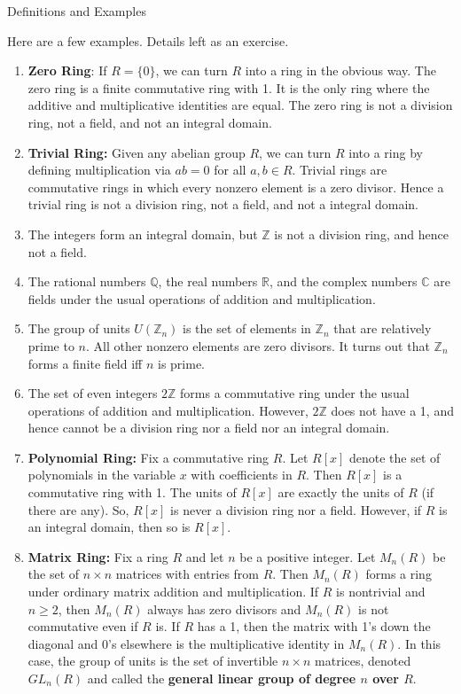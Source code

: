 \begin{section}{Definitions and Examples}
\begin{example}
Here are a few examples.  Details left as an exercise.
\begin{enumerate}[label=\rm{(\alph*)}]
\item \textbf{Zero Ring}: If $R=\{0\}$, we can turn $R$ into a ring in the obvious way.  The zero ring is a finite commutative ring with 1.  It is the only ring where the additive and multiplicative identities are equal.  The zero ring is not a division ring, not a field, and not an integral domain.
\item \textbf{Trivial Ring:} Given any abelian group $R$, we can turn $R$ into a ring by defining multiplication via $ab=0$ for all $a,b\in R$. Trivial rings are commutative rings in which every nonzero element is a zero divisor.  Hence a trivial ring is not a division ring, not a field, and not a integral domain.
\item 
The integers form an integral domain, but $\mathbb{Z}$ is not a division ring, and hence not a field.
\item The rational numbers $\mathbb{Q}$, the real numbers $\mathbb{R}$, and the complex numbers $\mathbb{C}$ are fields under the usual operations of addition and multiplication.
\item 
The group of units $U(\mathbb{Z}_n)$ is the set of elements in $\mathbb{Z}_n$ that are relatively prime to $n$.  All other nonzero elements are zero divisors.  It turns out that $\mathbb{Z}_n$ forms a finite field iff $n$ is prime.
\item The set of even integers $2\mathbb{Z}$ forms a commutative ring under the usual operations of addition and multiplication.  However, $2\mathbb{Z}$ does not have a 1, and hence cannot be a division ring nor a field nor an integral domain.
\item \textbf{Polynomial Ring:} Fix a commutative ring $R$.  Let $R[x]$ denote the set of polynomials in the variable $x$ with coefficients in $R$.  Then $R[x]$ is a commutative ring with 1. The units of $R[x]$ are exactly the units of $R$ (if there are any). So, $R[x]$ is never a division ring nor a field.  However, if $R$ is an integral domain, then so is $R[x]$. 
\item \textbf{Matrix Ring:} Fix a ring $R$ and let $n$ be a positive integer.  Let $M_n(R)$ be the set of $n\times n$ matrices with entries from $R$.  Then $M_n(R)$ forms a ring under ordinary matrix addition and multiplication.  If $R$ is nontrivial and $n\geq 2$, then $M_n(R)$ always has zero divisors and $M_n(R)$ is not commutative even if $R$ is.  If $R$ has a 1, then the matrix with 1's down the diagonal and 0's elsewhere is the multiplicative identity in $M_n(R)$.  In this case, the group of units is the set of invertible $n\times n$ matrices, denoted $GL_n(R)$ and called the \textbf{general linear group of degree $n$ over $R$}.

\end{enumerate}
\end{example}
\end{section}
